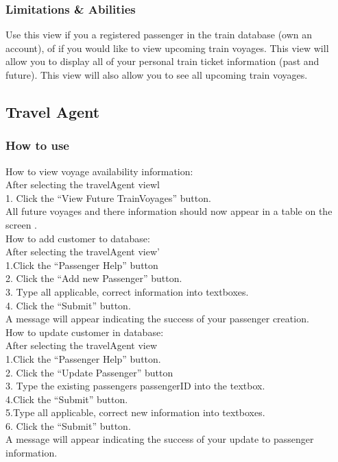 \documentclass[letter]{article}
\begin{document}
\subsubsection{Limitations \& Abilities}
Use this view if you a registered passenger in the train database (own an account), of if you would like to view upcoming train voyages. This view will allow you to display all of your personal train ticket information (past and future).  This view will also allow you to see all upcoming train voyages.

\subsection{Travel Agent}
\subsubsection{How to use}

How to view voyage availability information:\\
After selecting the travelAgent viewl\\  
1. Click the “View Future TrainVoyages” button. \\
All future voyages and there information should now appear in a table on the screen .\\ 


How to add customer to database:\\
After selecting the travelAgent view'\\
1.Click the “Passenger Help” button\\
2. Click the “Add new Passenger” button. \\
3. Type all applicable, correct information into textboxes.\\
4. Click the “Submit” button.\\
A message will appear indicating the success of your passenger creation.\\


How to update customer in database:\\
After selecting the travelAgent view\\
1.Click the “Passenger Help” button.\\
2. Click the “Update Passenger” button\\
3. Type the existing passengers passengerID into the textbox.\\
4.Click the “Submit” button. \\
5.Type all applicable, correct new information into textboxes.\\
6. Click the “Submit” button.\\
A message will appear indicating the success of your update to passenger information.\\ 
\end{document}
